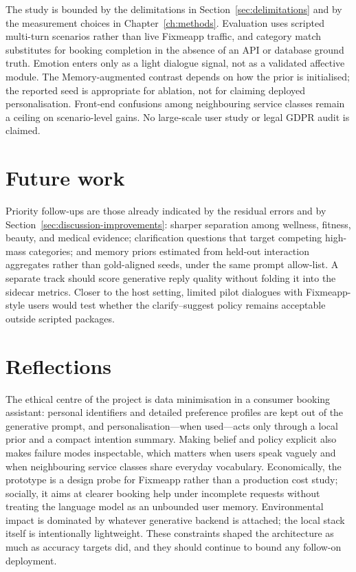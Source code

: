 The study is bounded by the delimitations in Section~\ref{sec:delimitations} and by the measurement choices in Chapter~\ref{ch:methods}.
Evaluation uses scripted multi-turn scenarios rather than live Fixmeapp traffic, and category match substitutes for booking completion in the absence of an API or database ground truth.
Emotion enters only as a light dialogue signal, not as a validated affective module.
The Memory-augmented contrast depends on how the prior is initialised; the reported seed is appropriate for ablation, not for claiming deployed personalisation.
Front-end confusions among neighbouring service classes remain a ceiling on scenario-level gains.
No large-scale user study or legal GDPR audit is claimed.

\section{Future work}
\label{sec:futureWork}

Priority follow-ups are those already indicated by the residual errors and by Section~\ref{sec:discussion-improvements}: sharper separation among wellness, fitness, beauty, and medical evidence; clarification questions that target competing high-mass categories; and memory priors estimated from held-out interaction aggregates rather than gold-aligned seeds, under the same prompt allow-list.
A separate track should score generative reply quality without folding it into the sidecar metrics.
Closer to the host setting, limited pilot dialogues with Fixmeapp-style users would test whether the clarify--suggest policy remains acceptable outside scripted packages.

\section{Reflections}
\label{sec:reflections}

The ethical centre of the project is data minimisation in a consumer booking assistant: personal identifiers and detailed preference profiles are kept out of the generative prompt, and personalisation---when used---acts only through a local prior and a compact intention summary.
Making belief and policy explicit also makes failure modes inspectable, which matters when users speak vaguely and when neighbouring service classes share everyday vocabulary.
Economically, the prototype is a design probe for Fixmeapp rather than a production cost study; socially, it aims at clearer booking help under incomplete requests without treating the language model as an unbounded user memory.
Environmental impact is dominated by whatever generative backend is attached; the local stack itself is intentionally lightweight.
These constraints shaped the architecture as much as accuracy targets did, and they should continue to bound any follow-on deployment.
